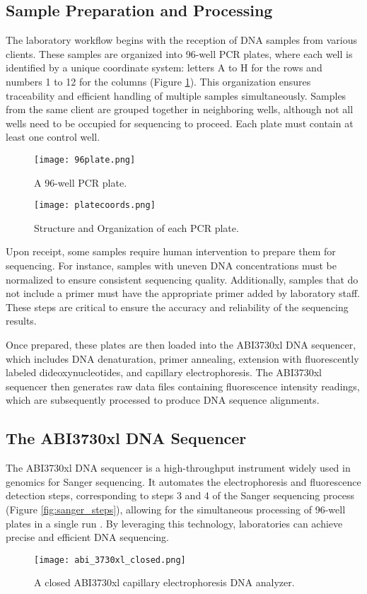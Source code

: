 \subsection{Sample Preparation and Processing}
The laboratory workflow begins with the reception of DNA samples from various clients. These samples are organized into 96-well PCR plates, where each well is identified by a unique coordinate system: letters A to H for the rows and numbers 1 to 12 for the columns (Figure \ref{fig:96_well_plate}). This organization ensures traceability and efficient handling of multiple samples simultaneously. Samples from the same client are grouped together in neighboring wells, although not all wells need to be occupied for sequencing to proceed. Each plate must contain at least one control well.
\begin{figure}[H]
  \centering
  \texttt{[image: 96plate.png]}
  \caption{A 96-well PCR plate.}
  \label{fig:96_well_plate}
\end{figure}


\begin{figure}[H]
  \centering
  \texttt{[image: platecoords.png]}
  \caption{Structure and Organization of each PCR plate.}
  \label{fig:platecoords}
\end{figure}

Upon receipt, some samples require human intervention to prepare them for sequencing. For instance, samples with uneven DNA concentrations must be normalized to ensure consistent sequencing quality. Additionally, samples that do not include a primer must have the appropriate primer added by laboratory staff. These steps are critical to ensure the accuracy and reliability of the sequencing results.

Once prepared, these plates are then loaded into the ABI3730xl DNA sequencer, which includes DNA denaturation, primer annealing, extension with fluorescently labeled dideoxynucleotides, and capillary electrophoresis. The ABI3730xl sequencer then generates raw data files containing fluorescence intensity readings, which are subsequently processed to produce DNA sequence alignments.


\subsection{The ABI3730xl DNA Sequencer}
The ABI3730xl DNA sequencer is a high-throughput instrument widely used in genomics for Sanger sequencing. It automates the electrophoresis and fluorescence detection steps, corresponding to steps 3 and 4 of the Sanger sequencing process (Figure \ref{fig:sanger_steps}), allowing for the simultaneous processing of 96-well plates in a single run \cite{smith_capillary_sequencing,abi3730xl_overview}. By leveraging this technology, laboratories can achieve precise and efficient DNA sequencing. 
\begin{figure}[h]
\centering
\texttt{[image: abi\_3730xl\_closed.png]}
\caption{A closed ABI3730xl capillary electrophoresis DNA analyzer.}
\label{fig:abi_3730xl_closed}
\end{figure}

